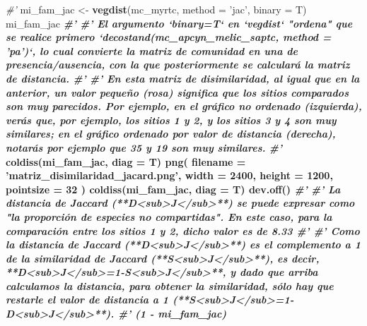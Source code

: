 \documentclass[11pt,]{article}
\newenvironment{Shaded}{\begin{snugshade}}{\end{snugshade}}
\newcommand{\KeywordTok}[1]{\textcolor[rgb]{0.13,0.29,0.53}{\textbf{#1}}}
\newcommand{\DataTypeTok}[1]{\textcolor[rgb]{0.13,0.29,0.53}{#1}}
\newcommand{\DecValTok}[1]{\textcolor[rgb]{0.00,0.00,0.81}{#1}}
\newcommand{\StringTok}[1]{\textcolor[rgb]{0.31,0.60,0.02}{#1}}
\newcommand{\CommentTok}[1]{\textcolor[rgb]{0.56,0.35,0.01}{\textit{#1}}}
\newcommand{\OperatorTok}[1]{\textcolor[rgb]{0.81,0.36,0.00}{\textbf{#1}}}
\newcommand{\NormalTok}[1]{#1}
\begin{document}
\begin{Shaded}
\begin{Highlighting}[]
{\CommentTok{#' }
\NormalTok{mi_fam_jac <-}\StringTok{ }\KeywordTok{vegdist}\NormalTok{(mc_myrtc, }\DataTypeTok{method =} \StringTok{'jac'}\NormalTok{, }\DataTypeTok{binary =}\NormalTok{ T)}
\NormalTok{mi_fam_jac }\OperatorTok{%
\CommentTok{#' }
\CommentTok{#' El argumento `binary=T` en `vegdist` "ordena" que se realice primero `decostand(mc_apcyn_melic_saptc, method = 'pa')`, lo cual convierte la matriz de comunidad en una de presencia/ausencia, con la que posteriormente se calculará la matriz de distancia.}
\CommentTok{#' }
\CommentTok{#' En esta matriz de disimilaridad, al igual que en la anterior, un valor pequeño (rosa) significa que los sitios comparados son muy parecidos. Por ejemplo, en el gráfico no ordenado (izquierda), verás que, por ejemplo, los sitios 1 y 2, y los sitios 3 y 4 son muy similares; en el gráfico ordenado por valor de distancia (derecha), notarás por ejemplo que 35 y 19 son muy similares.}
\CommentTok{#'  }
\KeywordTok{coldiss}\NormalTok{(mi_fam_jac, }\DataTypeTok{diag =}\NormalTok{ T)}
\KeywordTok{png}\NormalTok{(}
  \DataTypeTok{filename =} \StringTok{'matriz_disimilaridad_jacard.png'}\NormalTok{,}
  \DataTypeTok{width =} \DecValTok{2400}\NormalTok{, }\DataTypeTok{height =} \DecValTok{1200}\NormalTok{, }\DataTypeTok{pointsize =} \DecValTok{32}
\NormalTok{)}
\KeywordTok{coldiss}\NormalTok{(mi_fam_jac, }\DataTypeTok{diag =}\NormalTok{ T)}
\KeywordTok{dev.off}\NormalTok{()}
\CommentTok{#' }
\CommentTok{#' La distancia de Jaccard (**D<sub>J</sub>**) se puede expresar como "la proporción de especies no compartidas". En este caso, para la comparación entre los sitios 1 y 2, dicho valor es de 8.33%
\CommentTok{#' }
\CommentTok{#' Como la distancia de Jaccard (**D<sub>J</sub>**) es el complemento a 1 de la similaridad de Jaccard (**S<sub>J</sub>**), es decir, **D<sub>J</sub>=1-S<sub>J</sub>**, y dado que arriba calculamos la distancia, para obtener la similaridad, sólo hay que restarle el valor de distancia a 1 (**S<sub>J</sub>=1-D<sub>J</sub>**).}
\CommentTok{#' }
\NormalTok{(}\DecValTok{1} \OperatorTok{-}\StringTok{ }\NormalTok{mi_fam_jac) }\OperatorTok{%
}}}}
\end{Highlighting}
\end{Shaded}
\end{document}
